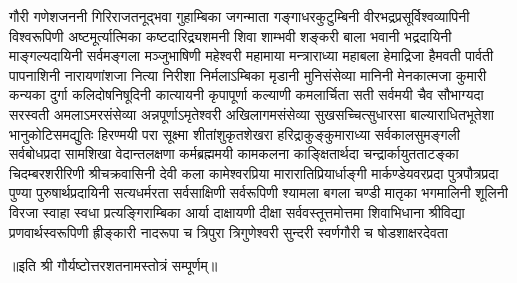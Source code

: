 
\twolineshloka
{गौरी गणेशजननी गिरिराजतनूद्भवा}
{गुहाम्बिका जगन्माता गङ्गाधरकुटुम्बिनी}
\twolineshloka
{वीरभद्रप्रसूर्विश्वव्यापिनी विश्वरूपिणी}
{अष्टमूर्त्यात्मिका कष्टदारिद्र्यशमनी शिवा}
\twolineshloka
{शाम्भवी शङ्करी बाला भवानी भद्रदायिनी}
{माङ्गल्यदायिनी सर्वमङ्गला मञ्जुभाषिणी}
\twolineshloka
{महेश्वरी महामाया मन्त्राराध्या महाबला}
{हेमाद्रिजा हैमवती पार्वती पापनाशिनी}
\twolineshloka
{नारायणांशजा नित्या निरीशा निर्मलाऽम्बिका}
{मृडानी मुनिसंसेव्या मानिनी मेनकात्मजा}
\twolineshloka
{कुमारी कन्यका दुर्गा कलिदोषनिषूदिनी}
{कात्यायनी कृपापूर्णा कल्याणी कमलार्चिता}
\twolineshloka
{सती सर्वमयी चैव सौभाग्यदा सरस्वती}
{अमलाऽमरसंसेव्या अन्नपूर्णाऽमृतेश्वरी}
\twolineshloka
{अखिलागमसंसेव्या सुखसच्चित्सुधारसा}
{बाल्याराधितभूतेशा भानुकोटिसमद्युतिः}
\twolineshloka
{हिरण्मयी परा सूक्ष्मा शीतांशुकृतशेखरा}
{हरिद्राकुङ्कुमाराध्या सर्वकालसुमङ्गली}
\twolineshloka
{सर्वबोधप्रदा सामशिखा वेदान्तलक्षणा}
{कर्मब्रह्ममयी कामकलना काङ्क्षितार्थदा}
\twolineshloka
{चन्द्रार्कायुतताटङ्का चिदम्बरशरीरिणी}
{श्रीचक्रवासिनी देवी कला कामेश्वरप्रिया}
\twolineshloka
{मारारातिप्रियार्धाङ्गी मार्कण्डेयवरप्रदा}
{पुत्रपौत्रप्रदा पुण्या पुरुषार्थप्रदायिनी}
\twolineshloka
{सत्यधर्मरता सर्वसाक्षिणी सर्वरूपिणी}
{श्यामला बगला चण्डी मातृका भगमालिनी}
\twolineshloka
{शूलिनी विरजा स्वाहा स्वधा प्रत्यङ्गिराम्बिका}
{आर्या दाक्षायणी दीक्षा सर्ववस्तूत्तमोत्तमा}
\threelineshloka
{शिवाभिधाना श्रीविद्या प्रणवार्थस्वरूपिणी}
{ह्रीङ्कारी नादरूपा च त्रिपुरा त्रिगुणेश्वरी}
{सुन्दरी स्वर्णगौरी च षोडशाक्षरदेवता}

{॥इति श्री गौर्यष्टोत्तरशतनामस्तोत्रं सम्पूर्णम्॥}
